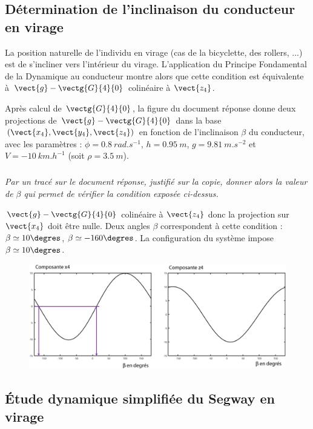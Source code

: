 \documentclass[10pt,fleqn]{article} %
\begin{document}
  \fi
  
\subsection{Détermination de l’inclinaison du conducteur en virage}

\ifprof
\else

La position naturelle de l’individu en virage (cas de la bicyclette, des rollers, ...) est de s’incliner vers l’intérieur du virage. L’application du Principe Fondamental de la Dynamique au conducteur montre alors que cette condition est équivalente à $\vect{g}-\vectg{G}{4}{0}$ colinéaire à $\vect{z_4}$.

Après calcul de $\vectg{G}{4}{0}$, la figure du document réponse donne deux projections de $\vect{g}-\vectg{G}{4}{0}$ dans la base $\left(\vect{x_4},\vect{y_4},\vect{z_4} \right)$ en fonction de l’inclinaison $\beta$ du conducteur, avec les paramètres : 
$\dot{\phi}=\SI{0,8}{rad.s^{-1}}$, 
$h=\SI{0,95}{m}$, 
$g=\SI{9,81}{m.s^{-2}}$ et 
$V=-\SI{10}{km.h^{-1}}$ (soit $\rho = \SI{3,5}{m}$).

\fi

\subparagraph{\label{q_12}}\textit{Par un tracé sur le document réponse, justifié sur la copie, donner alors la valeur de ${\beta}$ qui permet de vérifier la condition exposée ci-dessus.}
\ifprof
\begin{corrige}
$\vect{g}-\vectg{G}{4}{0}$ colinéaire à $\vect{z_4}$ donc la projection sur $\vect{x_4}$ doit être nulle.
Deux angles $\beta$ correspondent à cette condition : $\beta\simeq 10\degres$, $\beta\simeq -160\degres$. La configuration du système impose $\beta\simeq 10\degres$.



\begin{figure}[H]
\centering
\includegraphics[width=0.6\linewidth]{cor_04}
\end{figure}
\end{corrige}
\else
\fi


\subsection{\'Etude dynamique simplifiée du Segway en virage \label{iii:b}}
\end{document}
